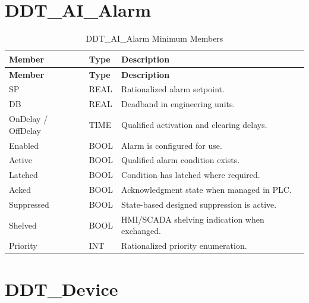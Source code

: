 \section{DDT\_AI\_Alarm}
\begin{longtable}{@{}P{3.90cm}P{3.90cm}P{9.10cm}@{}}
\caption{DDT\_AI\_Alarm Minimum Members}\label{tab:ddt-ai-alarm}\\
\toprule {}\textbf{Member} & \textbf{Type} & \textbf{Description}\\ \midrule
\endfirsthead
\toprule {}\textbf{Member} & \textbf{Type} & \textbf{Description}\\ \midrule
\endhead
SP & REAL & Rationalized alarm setpoint.\\
DB & REAL & Deadband in engineering units.\\
OnDelay / OffDelay & TIME & Qualified activation and clearing delays.\\
Enabled & BOOL & Alarm is configured for use.\\
Active & BOOL & Qualified alarm condition exists.\\
Latched & BOOL & Condition has latched where required.\\
Acked & BOOL & Acknowledgment state when managed in PLC.\\
Suppressed & BOOL & State-based designed suppression is active.\\
Shelved & BOOL & HMI/SCADA shelving indication when exchanged.\\
Priority & INT & Rationalized priority enumeration.\\
\bottomrule
\end{longtable}

\section{DDT\_Device}

